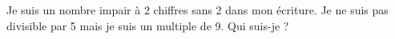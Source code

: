 \begin{exercice*}
   Je suis un nombre impair à 2 chiffres sans 2 dans mon écriture. Je ne suis pas divisible par 5 mais je suis un multiple de 9. Qui suis-je ? 
\end{exercice*}
